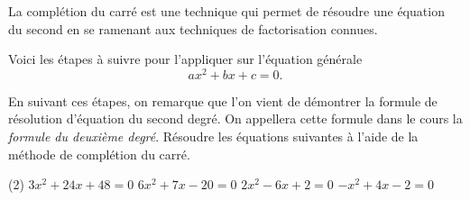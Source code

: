 \documentclass[a4paper,12pt]{report}
\begin{document}
La complétion du carré est une technique qui permet de résoudre une équation du second en se ramenant aux techniques de factorisation connues.
\begin{boiteExT}[$x^2-8x+4=0$]
	\vspace{10cm}	

\end{boiteExT}

\begin{boiteExT}[$2x^2+3x-2=0$]
	\vspace{10cm}	

\end{boiteExT}
\newpage
Voici les étapes à suivre pour l'appliquer sur l'équation générale 
\[ax^2+bx+c=0.\]
\begin{boiteExT}
	\vspace{20cm}
\end{boiteExT}
En suivant ces étapes, on remarque que l'on vient de démontrer la formule de résolution d'équation du second degré. On appellera cette formule dans le cours la \emph{formule du deuxième degré}.
Résoudre les équations suivantes à l'aide de la méthode de complétion du carré.
\begin{tasks}(2)
 \task $3 x^2+24 x+48=0$
 \task $6 x^2+7 x-20=0$
 \task $2 x^2-6 x+2=0$
 \task $-x^2+4 x-2=0$
\end{tasks}
\end{document}
